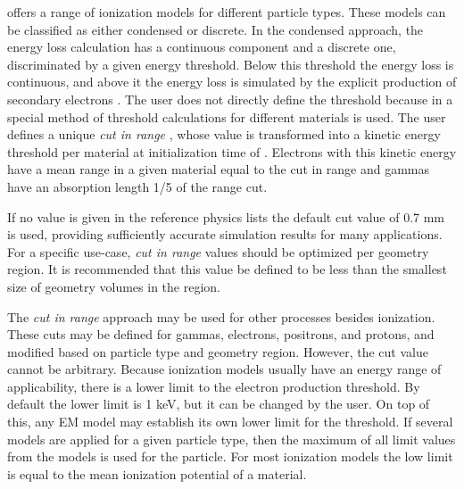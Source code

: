 
\Gfour{} offers a range of ionization models for different particle types.  These 
models can be classified as either condensed or discrete.  In the condensed 
approach, the energy loss calculation has a continuous component and a discrete
one, discriminated by a given energy threshold.  Below this threshold the energy
loss is continuous, and above it the energy loss is simulated by the explicit 
production of secondary electrons \cite{embib:design}.  The user does not 
directly define the threshold because in \Gfour{} a special method of threshold 
calculations for different materials is used.  The user defines a unique 
\emph{cut in range}  \cite{bib:G4}, whose value is transformed into a kinetic 
energy threshold per material at initialization time of \Gfour{}.  Electrons 
with this kinetic energy have a mean range in a given material equal to the cut
in range and gammas have an absorption length 1/5 of the range cut.

If no value is given in the reference physics lists the default cut value of 
0.7 mm is used, providing sufficiently accurate simulation results for many 
applications.  For a specific use-case, \emph{cut in range} values should be 
optimized per geometry region.  It is recommended that this value be defined to
be less than the smallest size of geometry volumes in the region.
 
The \emph{cut in range} approach may be used for other processes besides 
ionization.  These cuts may be defined for gammas, electrons, positrons, and 
protons, and modified based on particle type and geometry region.  However, the
cut value cannot be arbitrary.  Because \Gfour{} ionization models usually have an
energy range of applicability, there is a lower limit to the electron production 
threshold.  By default the lower limit is 1 keV, but it can be changed by the 
user.  On top of this, any EM model may establish its own lower limit for the 
threshold.  If several models are applied for a given particle type, then the 
maximum of all limit values from the models is used for the particle.  For most 
ionization models the low limit is equal to the mean ionization potential of a
material. 

